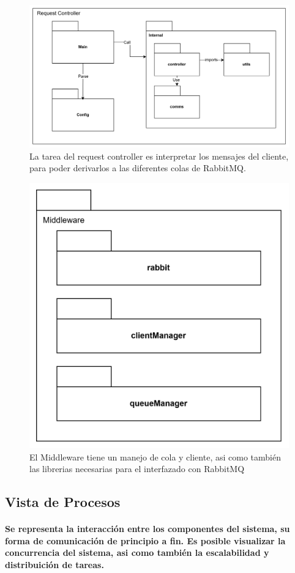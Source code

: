\documentclass[titlepage,a4paper]{article}
\begin{document}
\begin{figure}[H]
    \centering
    \includegraphics[width=1\linewidth]{request_controller.png}
    \caption{La tarea del request controller es interpretar los mensajes del cliente, para poder derivarlos a las diferentes colas de RabbitMQ.}
\end{figure}

\begin{figure}[H]
    \centering
    \includegraphics[width=0.45\linewidth]{middleware.png}
    \caption{El Middleware tiene un manejo de cola y cliente, asi como también las librerias necesarias para el interfazado con RabbitMQ}
\end{figure}

\subsection{Vista de Procesos}

\paragraph{Se representa la interacción entre los componentes del sistema, su forma de comunicación de principio a fin. Es posible visualizar la concurrencia del sistema, asi como también la escalabilidad y distribuición de tareas.}
\end{document}
